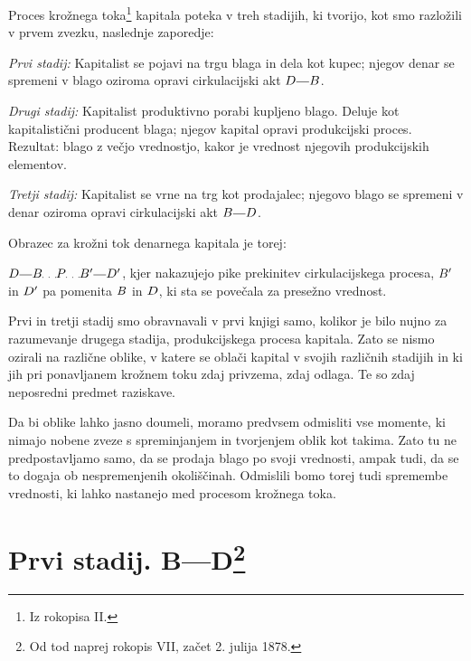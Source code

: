 \documentclass[kapital_02.tex]{subfiles}
\begin{document}
Proces krožnega toka\footnote{Iz rokopisa II.} kapitala poteka v treh stadijih, ki tvorijo, kot smo razložili v prvem zvezku, naslednje zaporedje:

\emph{Prvi stadij:} Kapitalist se pojavi na trgu blaga in dela kot kupec; njegov denar se spremeni v blago oziroma opravi cirkulacijski akt \(\KPED\KPEcrta\KPEB\).

\emph{Drugi stadij:} Kapitalist produktivno porabi kupljeno blago. Deluje kot kapitalistični producent blaga; njegov kapital opravi produkcijski proces. Rezultat: blago z večjo vrednostjo, kakor je vrednost njegovih produkcijskih elementov.

\emph{Tretji stadij:} Kapitalist se vrne na trg kot prodajalec; njegovo blago se spremeni v denar oziroma opravi cirkulacijski akt \(\KPEB\KPEcrta\KPED\).

Obrazec za krožni tok denarnega kapitala 
je torej:

\(\KPED\KPEcrta\KPEB\KPEpike\KPEP\KPEpike\KPEB'\KPEcrta\KPED'\), kjer nakazujejo pike prekinitev cirkulacijskega procesa, \(B'\) in \(D'\) pa pomenita \(B\) in \(D\), ki sta se povečala za presežno vrednost.

Prvi in tretji stadij smo obravnavali v prvi knjigi samo, kolikor je bilo nujno za razumevanje drugega stadija, produkcijskega procesa kapitala. Zato se nismo ozirali na različne oblike, v katere se oblači kapital v svojih različnih stadijih in ki jih pri ponavljanem krožnem toku zdaj privzema, zdaj odlaga. Te so zdaj neposredni predmet raziskave.

Da bi oblike lahko jasno doumeli, moramo predvsem odmisliti vse momente, ki nimajo nobene zveze s spreminjanjem in tvorjenjem oblik kot takima. Zato tu ne predpostavljamo samo, da se prodaja blago po svoji vrednosti, ampak tudi, da se to dogaja ob nespremenjenih okoliščinah. Odmislili bomo torej tudi spremembe vrednosti, ki lahko nastanejo med procesom krožnega toka.

\section{Prvi stadij. B---D\footnote{Od tod naprej rokopis VII, začet 2. julija 1878.}}
\end{document}

